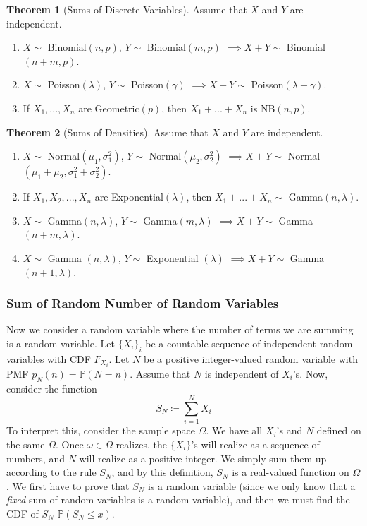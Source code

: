 \documentclass{article}
\theoremstyle{definition}
\newtheorem{theorem}{Theorem}[section]
\theoremstyle{remark}
\theoremstyle{definition}
\begin{document}
\begin{theorem}[Sums of Discrete Variables]
Assume that $X$ and $Y$ are independent. 
\begin{enumerate}
    \item $X \sim$ Binomial$(n, p)$, $Y \sim$ Binomial$(m, p)$ $\implies X + Y \sim$ Binomial$(n + m, p)$. 
    \item $X \sim$ Poisson$(\lambda)$, $Y \sim$ Poisson$(\gamma)$ $\implies X + Y \sim$ Poisson$(\lambda + \gamma)$. 
    \item If $X_1, ..., X_n$ are Geometric$(p)$, then $X_1 + ... + X_n$ is NB$(n, p)$. 
\end{enumerate}
\end{theorem}

\begin{theorem}[Sums of Densities]
Assume that $X$ and $Y$ are independent. 
\begin{enumerate}
    \item $X \sim$ Normal$(\mu_1, \sigma_1^2)$, $Y \sim$ Normal$(\mu_2, \sigma_2^2)$ $\implies X + Y \sim$ Normal $(\mu_1 + \mu_2, \sigma_1^2 + \sigma_2^2)$. 
    \item If $X_1, X_2, ..., X_n$ are Exponential$(\lambda)$, then $X_1 + ... + X_n \sim$ Gamma$(n, \lambda)$.
    \item $X \sim$ Gamma$(n, \lambda)$, $Y \sim$ Gamma$(m, \lambda)$ $\implies X + Y \sim$ Gamma$(n + m, \lambda)$. 
    \item $X \sim$ Gamma $(n, \lambda)$, $Y \sim$ Exponential $(\lambda)$ $\implies X + Y \sim$ Gamma$(n+1, \lambda)$. 
\end{enumerate}
\end{theorem}

\subsubsection{Sum of Random Number of Random Variables}

Now we consider a random variable where the number of terms we are summing is a random variable. Let $\{X_i\}_i$ be a countable sequence of independent random variables with CDF $F_{X_i}$. Let $N$ be a positive integer-valued random variable with PMF $p_N(n) = \mathbb{P}(N = n)$. Assume that $N$ is independent of $X_i$'s. Now, consider the function 
\[S_N \coloneqq \sum_{i=1}^N X_i\]
To interpret this, consider the sample space $\Omega$. We have all $X_i$'s and $N$ defined on the same $\Omega$. Once $\omega \in \Omega$ realizes, the $\{X_i\}$'s will realize as a sequence of numbers, and $N$ will realize as a positive integer. We simply sum them up according to the rule $S_N$, and by this definition, $S_N$ is a real-valued function on $\Omega$. We first have to prove that $S_N$ is a random variable (since we only know that a \textit{fixed} sum of random variables is a random variable), and then we must find the CDF of $S_N$ $\mathbb{P}(S_N \leq x)$. 
\end{document}
